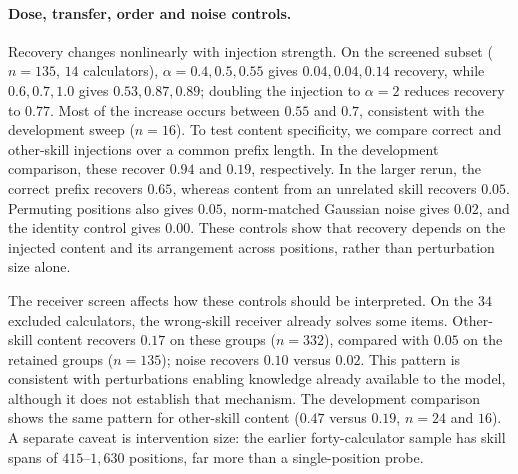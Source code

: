 \documentclass{article}
\begin{document}
\paragraph{Dose, transfer, order and noise controls.}
Recovery changes nonlinearly with injection strength. On the screened subset
($n=135$, $14$ calculators), $\alpha=0.4,0.5,0.55$ gives
$0.04,0.04,0.14$ recovery, while $0.6,0.7,1.0$ gives $0.53,0.87,0.89$;
doubling the injection to $\alpha=2$ reduces recovery to $0.77$. Most of the
increase occurs between $0.55$ and $0.7$, consistent with the development
sweep ($n=16$). To test content specificity, we compare correct and other-skill
injections over a common prefix length. In the development comparison, these
recover $0.94$ and $0.19$, respectively. In the larger rerun, the correct
prefix recovers $0.65$, whereas content from an unrelated skill recovers
$0.05$. Permuting positions also gives $0.05$, norm-matched Gaussian noise
gives $0.02$, and the identity control gives $0.00$. These controls show that
recovery depends on the injected content and its arrangement across positions,
rather than perturbation size alone.

\begin{table}[t]
\caption{Span interventions on the screened MedCalc subset: $135$ items from
$14$ calculators, selected from $467$ rescued items across $48$ calculators
by requiring the wrong-skill receiver to solve no sampled item in a group. Recovery uses
Eq.~\ref{eq:rho}. Accuracy intervals retain the original item-level normal
approximation; the group-bootstrap interval for transplant recovery is reported
in Table~\ref{tab:replication}. The final rows are identity and unpatched controls.}
\label{tab:big40}
\centering
\small

\end{table}

The receiver screen affects how these controls should be interpreted. On the
$34$ excluded calculators, the wrong-skill receiver already solves some items.
Other-skill content recovers $0.17$ on these groups ($n=332$), compared with
$0.05$ on the retained groups ($n=135$); noise recovers $0.10$ versus $0.02$.
This pattern is consistent with perturbations enabling knowledge already
available to the model, although it does not establish that mechanism.
The development comparison shows the same pattern for other-skill content
($0.47$ versus $0.19$, $n=24$ and $16$). A separate caveat is intervention
size: the earlier forty-calculator sample has skill spans of
$415$--$1{,}630$ positions, far more than a single-position probe.
\end{document}
